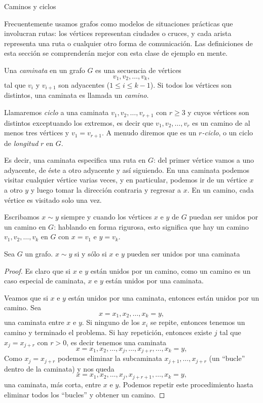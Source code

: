 \begin{section}{Caminos y ciclos}\label{5.4}

Frecuentemente usamos grafos como modelos de situaciones prácticas
que involucran rutas: los vértices representan ciudades o cruces,
y cada arista representa una ruta o cualquier otro forma de
comunicación. Las definiciones de esta sección se comprenderán
mejor con esta clase de ejemplo en mente.

\begin{definicion} \rm Una {\em caminata} en un grafo $G$ es  
una secuencia de vértices
$$
v_1,v_2,\ldots,v_k,
$$
tal que $v_i$ y $v_{i+1}$ son adyacentes ($1 \le i \le k-1$). Si
todos los vértices son distintos, una caminata es llamada un {\em
camino}.  

Llamaremos {\em ciclo} a una caminata 
$v_1,v_2,\ldots,v_{r+1}$  con $r \ge 3$ y cuyos vértices son distintos exceptuando
los extremos, es decir que $v_1,v_2,\ldots,v_{r}$ es un camino de al menos tres vértices y $v_1=v_{r+1}$.  A menudo diremos que es un {\em
$r$-ciclo}, o un ciclo de {\em longitud} $r$ en $G$.
\end{definicion}

Es decir, una caminata especifica una ruta en $G$: del primer
vértice vamos a uno adyacente, de éste a otro adyacente y así
siguiendo. En una caminata podemos visitar cualquier vértice
varias veces, y en particular, podemos ir de un vértice $x$ a otro
$y$ y luego tomar la dirección contraria y regresar a $x$. En un
camino, cada vértice es visitado solo una vez.

Escribamos $x \sim y$ siempre y cuando los vértices $x$ e $y$ de
$G$ puedan ser unidos por un camino en $G$: hablando en forma
rigurosa, esto significa que hay un camino $v_1,v_2,\ldots,v_k$ en
$G$ con $x=v_1$ e $y=v_k$. 

\begin{lema} Sea $G$ un grafo. $x \sim y$ si  y sólo si $x$ e $y$ pueden ser unidos por una caminata 
\end{lema}
\begin{proof}Es claro que si $x$ e $y$ están unidos por un camino, como  un camino es un caso especial de caminata, $x$ e $y$ están unidos por una caminata.

Veamos que si  $x$ e $y$ están unidos por una caminata, entonces están unidos por un camino. Sea 
$$
x=x_1,x_2,\ldots,x_k=y,
$$
una caminata entre  $x$ e $y$. Si ninguno de los $x_i$ se repite, entonces tenemos un camino y terminado el problema. Si hay repetición, entonces existe $j$ tal que $x_j = x_{j+r}$ con $r >0$, es decir tenemos una caminata
$$
x=x_1,x_2,\ldots,x_j,\ldots,x_{j+r},\ldots, x_k=y,
$$
Como $x_j = x_{j+r}$ podemos eliminar la subcaminata $x_{j+1},\ldots,x_{j+r}$ (un ``bucle'' dentro de la caminata) y nos queda 
$$
x=x_1,x_2,\ldots,x_j,x_{j+r+1},\ldots, x_k=y,
$$
una caminata, más corta,  entre $x$ e $y$. Podemos repetir este procedimiento hasta eliminar todos los ``bucles'' y obtener un camino.
\end{proof}


\end{section}
